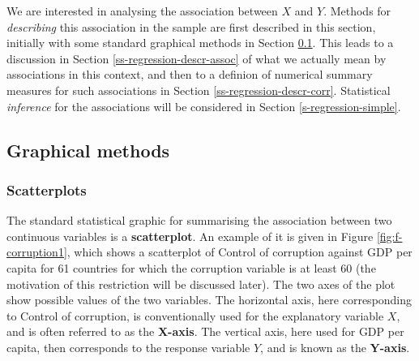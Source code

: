 \documentclass[11pt,a4paper,openany]{book}
\begin{document}
We are interested in analysing the association between \(X\) and \(Y\).
Methods for \emph{describing} this association in the sample are first
described in this section, initially with some standard graphical
methods in Section \ref{ss-regression-descr-plots}. This leads to a
discussion in Section \ref{ss-regression-descr-assoc} of what we
actually mean by associations in this context, and then to a definion of
numerical summary measures for such associations in Section
\ref{ss-regression-descr-corr}. Statistical \emph{inference} for the
associations will be considered in Section \ref{s-regression-simple}.

\subsection{Graphical methods}\label{ss-regression-descr-plots}

\subsubsection*{Scatterplots}\label{scatterplots}

The standard statistical graphic for summarising the association between
two continuous variables is a \textbf{scatterplot}. An example of it is
given in Figure \ref{fig:f-corruption1}, which shows a scatterplot of
Control of corruption against GDP per capita for 61 countries for which
the corruption variable is at least 60 (the motivation of this
restriction will be discussed later). The two axes of the plot show
possible values of the two variables. The horizontal axis, here
corresponding to Control of corruption, is conventionally used for the
explanatory variable \(X\), and is often referred to as the
\textbf{X-axis}. The vertical axis, here used for GDP per capita, then
corresponds to the response variable \(Y\), and is known as the
\textbf{Y-axis}.
\end{document}
